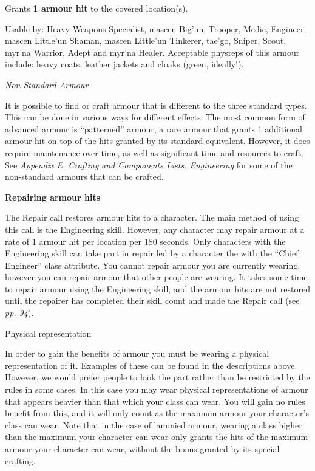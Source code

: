 \documentclass{scrbook}
\begin{document}
Grants \textbf{1 armour hit} to the covered location(s).

Usable by: Heavy Weapons Specialist, mascen Big'un, Trooper, Medic, Engineer, mascen Little'un Shaman, mascen Little'un Tinkerer, tae'go, Sniper, Scout, myr'na Warrior, Adept and myr'na Healer. Acceptable physreps of this armour include: heavy coats, leather jackets and cloaks (green, ideally!).

\textit{Non-Standard Armour}

It is possible to find or craft armour that is different to the three standard types. This can be done in various ways for different effects. The most common form of advanced armour is ``patterned'' armour, a rare armour that grants 1 additional armour hit on top of the hits granted by its standard equivalent. However, it does require maintenance over time, as well as significant time and resources to craft. See \textit{Appendix E. Crafting} \textit{and Components Lists: Engineering} for some of the non-standard armours that can be crafted.

\textbf{Repairing armour hits}

The Repair call restores armour hits to a character. The main method of using this call is the Engineering skill. However, any character may repair armour at a rate of 1 armour hit per location per 180 seconds. Only characters with the Engineering skill can take part in repair led by a character the with the ``Chief Engineer'' class attribute. You cannot repair armour you are currently wearing, however you can repair armour that other people are wearing. It takes some time to repair armour using the Engineering skill, and the armour hits are not restored until the repairer has completed their skill count and made the Repair call (see \textit{pp. 94}).

Physical representation

In order to gain the benefits of armour you must be wearing a physical representation of it. Examples of these can be found in the descriptions above. However, we would prefer people to look the part rather than be restricted by the rules in some cases. In this case you may wear physical representations of armour that appears heavier than that which your class can wear. You will gain no rules benefit from this, and it will only count as the maximum armour your character's class can wear. Note that in the case of lammied armour, wearing a class higher than the maximum your character can wear only grants the hits of the maximum armour your character can wear, without the bonus granted by its special crafting.
\end{document}
